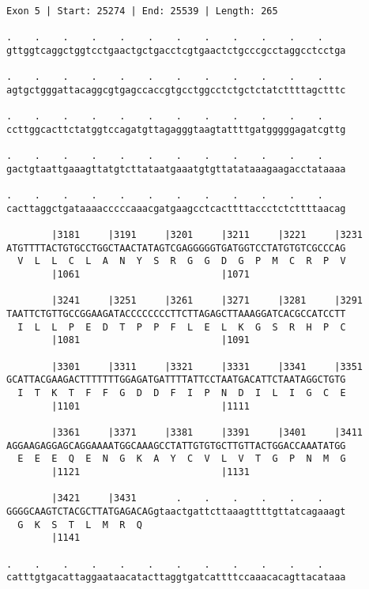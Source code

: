 \documentclass{article}
\begin{document}
\begin{Verbatim}[fontfamily=courier]
Exon 5 | Start: 25274 | End: 25539 | Length: 265

.    .    .    .    .    .    .    .    .    .    .    .    
gttggtcaggctggtcctgaactgctgacctcgtgaactctgcccgcctaggcctcctga

.    .    .    .    .    .    .    .    .    .    .    .    
agtgctgggattacaggcgtgagccaccgtgcctggcctctgctctatcttttagctttc

.    .    .    .    .    .    .    .    .    .    .    .    
ccttggcacttctatggtccagatgttagagggtaagtattttgatgggggagatcgttg

.    .    .    .    .    .    .    .    .    .    .    .    
gactgtaattgaaagttatgtcttataatgaaatgtgttatataaagaagacctataaaa

.    .    .    .    .    .    .    .    .    .    .    .    
cacttaggctgataaaacccccaaacgatgaagcctcacttttaccctctcttttaacag

        |3181     |3191     |3201     |3211     |3221     |3231
ATGTTTTACTGTGCCTGGCTAACTATAGTCGAGGGGGTGATGGTCCTATGTGTCGCCCAG
  V  L  L  C  L  A  N  Y  S  R  G  G  D  G  P  M  C  R  P  V
        |1061                         |1071                 

        |3241     |3251     |3261     |3271     |3281     |3291
TAATTCTGTTGCCGGAAGATACCCCCCCCTTCTTAGAGCTTAAAGGATCACGCCATCCTT
  I  L  L  P  E  D  T  P  P  F  L  E  L  K  G  S  R  H  P  C
        |1081                         |1091                 

        |3301     |3311     |3321     |3331     |3341     |3351
GCATTACGAAGACTTTTTTTGGAGATGATTTTATTCCTAATGACATTCTAATAGGCTGTG
  I  T  K  T  F  F  G  D  D  F  I  P  N  D  I  L  I  G  C  E
        |1101                         |1111                 

        |3361     |3371     |3381     |3391     |3401     |3411
AGGAAGAGGAGCAGGAAAATGGCAAAGCCTATTGTGTGCTTGTTACTGGACCAAATATGG
  E  E  E  Q  E  N  G  K  A  Y  C  V  L  V  T  G  P  N  M  G
        |1121                         |1131                 

        |3421     |3431       .    .    .    .    .    .    
GGGGCAAGTCTACGCTTATGAGACAGgtaactgattcttaaagttttgttatcagaaagt
  G  K  S  T  L  M  R  Q                                    
        |1141                                               

.    .    .    .    .    .    .    .    .    .    .    .    
catttgtgacattaggaataacatacttaggtgatcattttccaaacacagttacataaa

\end{Verbatim}
\end{document}
